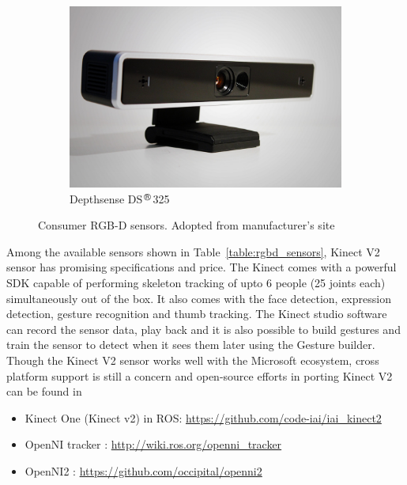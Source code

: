 \begin{figure}
\begin{subfigure}[b]{0.33\textwidth}
\label{fig:creative_senz3d}
\end{subfigure}%
\begin{subfigure}[b]{0.33\textwidth}
\includegraphics[width=\textwidth]{assets/depthsense_DS311.jpg}
\caption{Depthsense DS$^{\regmark}$325}
\label{fig:depthsense}
\end{subfigure}
\caption[Consumer RGB-D sensors]{Consumer RGB-D sensors. {Adopted from manufacturer's site}}
\label{fig:rgbd_sensors}
\end{figure}
	Among the available sensors shown in Table~\ref{table:rgbd_sensors}, Kinect V2\cite{Kinect2014} sensor has promising specifications and price. The Kinect comes with a powerful SDK\cite{KinectSDK2014} capable of performing skeleton tracking of upto 6 people (25 joints each) simultaneously out of the box. It also comes with the face detection, expression detection, gesture recognition and thumb tracking. The Kinect studio software can record the sensor data, play back and it is also possible to build gestures and train the sensor to detect when it sees them later using the Gesture builder. Though the Kinect V2 sensor works well with the Microsoft ecosystem, cross platform support is still a concern and open-source efforts in porting Kinect V2 can be found in
\begin{itemize}
\item Kinect One (Kinect v2) in ROS: \url{https://github.com/code-iai/iai_kinect2}
\item OpenNI tracker : \url{http://wiki.ros.org/openni_tracker}
\item OpenNI2 : \url{https://github.com/occipital/openni2}
\end{itemize}

